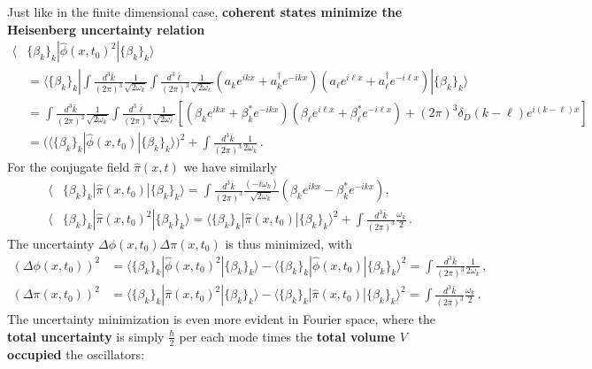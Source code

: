 \documentclass[../QFT_main.tex]{subfiles}
\begin{document}
\begin{mytheorem}
Just like in the finite dimensional case, \textbf{coherent states minimize the Heisenberg uncertainty relation} 
{\small
\begin{align}
    \langle& \{\beta_k\}_k | \hat{\phi}(x,t_0)^2 | \{\beta_k\}_k \rangle \\
    &=\langle \{\beta_k\}_k | \int \frac{d^3\bar{k}}{(2\pi)^3} \frac{1}{\sqrt{2\omega_k}} \int \frac{d^3\bar{\ell}}{(2\pi)^3} \frac{1}{\sqrt{2\omega_{\ell}}} \left( a_k e^{ikx} + a_k^{\dagger} e^{-ikx} \right)\left( a_{\ell} e^{i\ell x} + a_{\ell}^{\dagger} e^{-i\ell x} \right) | \{\beta_k\}_k \rangle\\
    &=  \int \frac{d^3\bar{k}}{(2\pi)^3} \frac{1}{\sqrt{2\omega_k}}\int \frac{d^3\bar{\ell}}{(2\pi)^3} \frac{1}{\sqrt{2\omega_{\ell}}} \left[ \left( \beta_k e^{ikx} + \beta_k^* e^{-ikx} \right)\left( \beta_{\ell} e^{i\ell x} + \beta_{\ell}^* e^{-i\ell x} \right)+ (2\pi)^3\delta_D(k-\ell) e^{i(k-\ell)x}\right]\\
    &= \Big(\langle \{\beta_k\}_k | \hat{\phi}(x,t_0) | \{\beta_k\}_k \rangle\Big)^2 + \int \frac{d^3\bar{k}}{(2\pi)^3} \frac{1}{2\omega_k}\,.
\end{align}
}
For the conjugate field $\hat{\pi}(x,t)$ we have similarly
{\small
\begin{align}
    \langle& \{\beta_k\}_k | \hat{\pi}(x,t_0)| \{\beta_k\}_k \rangle = \int \frac{d^3\bar{k}}{(2\pi)^3} \frac{(-i\omega_k)}{\sqrt{2\omega_k}} \left( \beta_k e^{ikx} - \beta_k^* e^{-ikx} \right),\\[4pt]
    \langle& \{\beta_k\}_k | \hat{\pi}(x,t_0)^2 | \{\beta_k\}_k \rangle 
    = \langle \{\beta_k\}_k | \hat{\pi}(x,t_0) | \{\beta_k\}_k \rangle^2 + \int \frac{d^3\bar{k}}{(2\pi)^3} \frac{\omega_k}{2}\,.
\end{align}
}
The uncertainty $\Delta \phi(x,t_0) \Delta \pi(x,t_0)$ is thus minimized, with
\begin{align}
    (\Delta \phi(x,t_0))^2 &= \langle \{\beta_k\}_k | \hat{\phi}(x,t_0)^2 | \{\beta_k\}_k \rangle - \langle \{\beta_k\}_k | \hat{\phi}(x,t_0) | \{\beta_k\}_k \rangle^2 = \int \frac{d^3\bar{k}}{(2\pi)^3} \frac{1}{2\omega_k}\,,\\
    (\Delta \pi(x,t_0))^2 &= \langle \{\beta_k\}_k | \hat{\pi}(x,t_0)^2 | \{\beta_k\}_k \rangle - \langle \{\beta_k\}_k | \hat{\pi}(x,t_0) | \{\beta_k\}_k \rangle^2 = \int \frac{d^3\bar{k}}{(2\pi)^3} \frac{\omega_k}{2}\,.
\end{align}
The uncertainty minimization is even more evident in Fourier space, where the \textbf{total uncertainty} is simply $\tfrac{\hbar}{2}$ per each mode times the \textbf{total volume $V$ occupied} the oscillators:

\end{mytheorem}
\end{document}

